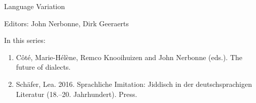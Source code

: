 {\large Language Variation}

\bigskip

Editors: John Nerbonne, Dirk Geeraerts

\bigskip

In this series:

\begin{enumerate}
\item Côté, Marie-Hélène, Remco Knooihuizen and John Nerbonne (eds.). The future of dialects.
\item Schäfer, Lea. 2016. Sprachliche Imitation: Jiddisch in der deutschsprachigen
Literatur (18.–20. Jahrhundert).
Press.
\end{enumerate}



\vfill



